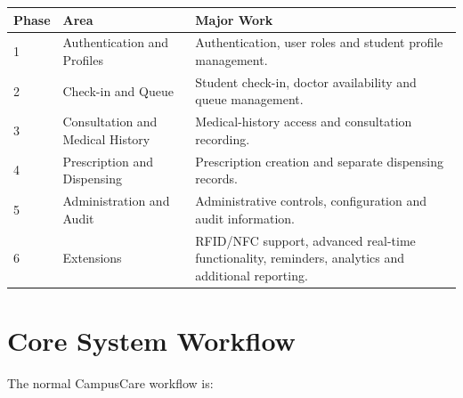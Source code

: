 \documentclass{tietreport}
\begin{document}
\begin{longtable}{p{1.2cm}p{4.0cm}p{7.0cm}}
\toprule
\textbf{Phase} & \textbf{Area} & \textbf{Major Work} \\
\midrule

1 &
Authentication and Profiles &
Authentication, user roles and student profile management. \\

2 &
Check-in and Queue &
Student check-in, doctor availability and queue management. \\

3 &
Consultation and Medical History &
Medical-history access and consultation recording. \\

4 &
Prescription and Dispensing &
Prescription creation and separate dispensing records. \\

5 &
Administration and Audit &
Administrative controls, configuration and audit information. \\

6 &
Extensions &
RFID/NFC support, advanced real-time functionality, reminders,
analytics and additional reporting. \\

\bottomrule
\end{longtable}

\section{Core System Workflow}

The normal CampusCare workflow is:
\end{document}
